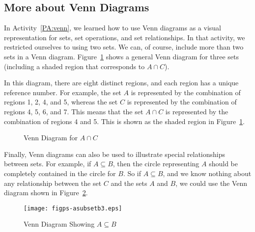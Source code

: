 \subsection*{More about Venn Diagrams} \label{ss:venn3}
In \typeu Activity~\ref*{PA:venn}, we learned how to use Venn diagrams as a visual representation for sets, set operations, and set relationships.  In that activity, we restricted ourselves to using two sets.  We can, of course, include more than two sets in a Venn diagram.  Figure~\ref{fig:aintersectc} shows a general Venn diagram for three sets (including a shaded region that corresponds to $A \cap C$). 


In this diagram, there are eight distinct regions, and each region has a unique reference number.  For example, the set  $A$  is represented by the combination of regions 1, 2, 4, and 5, whereas the set  $C$  is represented by the combination of regions  4, 5, 6, and 7.  This means that the set $A \cap C$ is represented by the combination of regions  4  and  5.  This is shown as the shaded region in Figure~\ref{fig:aintersectc}.

\begin{figure}[h!]
\begin{center}
\caption{Venn Diagram for $A \cap C$} \label{fig:aintersectc}
\end{center}
\end{figure}

Finally, Venn diagrams can also be used to illustrate special relationships between sets.  For example, if  $A \subseteq B$, then the circle representing  $A$  should be completely contained in the circle for  $B$.  So if  $A \subseteq B$, and we know nothing about any relationship between the set  $C$ and the sets $A$ and $B$, we could use the Venn diagram shown in Figure~\ref{fig:asubsetb}.

\begin{figure}[h!]
\begin{center}
\texttt{[image: figps-asubsetb3.eps]}
\caption{Venn Diagram Showing $A \subseteq B$} \label{fig:asubsetb}
\end{center}
\end{figure}

